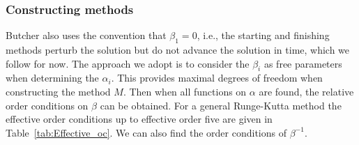 \subsubsection{Constructing methods}
Butcher \cite{Butcher2008_book} also uses the convention that $\beta_1 = 0$, i.e., the starting and finishing methods perturb the solution but do not advance the solution in time, which we follow for now.
The approach we adopt is to consider the $\beta_{i}$ as free parameters when determining the $\alpha_i$. This provides maximal degrees of freedom when constructing the method $M$. Then when all functions on $\alpha$ are found, the relative order conditions on $\beta$ can be obtained. For a general Runge-Kutta method the effective order conditions up to effective order five are given in Table~\ref{tab:Effective_oc}. We can also find the order conditions of $\beta^{-1}$.

